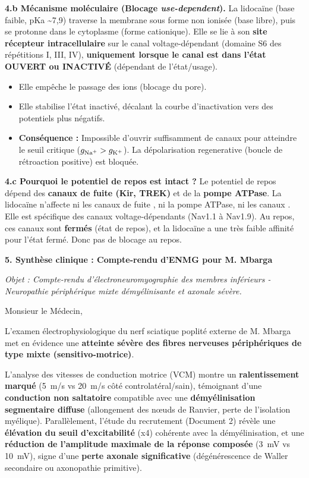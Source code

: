 \documentclass[11pt]{article}
\begin{document}
\begin{exoresolu}
\textbf{4.b Mécanisme moléculaire (Blocage \emph{use-dependent}).}
La lidocaïne (base faible, pKa \textasciitilde 7,9) traverse la membrane sous forme non ionisée (base libre), puis se protonne dans le cytoplasme (forme cationique). Elle se lie à son \textbf{site récepteur intracellulaire} sur le canal  voltage-dépendant (domaine S6 des répétitions I, III, IV), \textbf{uniquement lorsque le canal est dans l'état OUVERT ou INACTIVÉ} (dépendant de l'état/usage).
\begin{itemize}
    \item Elle empêche le passage des ions  (blocage du pore).
    \item Elle stabilise l'état inactivé, décalant la courbe d'inactivation vers des potentiels plus négatifs.
    \item \textbf{Conséquence :} Impossible d'ouvrir suffisamment de canaux  pour atteindre le seuil critique ($g_{\ce{Na+}} > g_{\ce{K+}}$). La dépolarisation regenerative (boucle de rétroaction positive) est bloquée.
\end{itemize}

\textbf{4.c Pourquoi le potentiel de repos est intact ?}
Le potentiel de repos dépend des \textbf{canaux de fuite  (Kir, TREK)} et de la \textbf{pompe  ATPase}. La lidocaïne n'affecte ni les canaux de fuite , ni la pompe ATPase, ni les canaux . Elle est spécifique des canaux  voltage-dépendants (Nav1.1 à Nav1.9). Au repos, ces canaux sont \textbf{fermés} (état de repos), et la lidocaïne a une très faible affinité pour l'état fermé. Donc pas de blocage au repos.

\textbf{5. Synthèse clinique : Compte-rendu d'ENMG pour M. Mbarga}

\textit{Objet : Compte-rendu d'électroneuromyographie des membres inférieurs - Neuropathie périphérique mixte démyélinisante et axonale sévère.}

Monsieur le Médecin,

L'examen électrophysiologique du nerf sciatique poplité externe de M. Mbarga met en évidence une \textbf{atteinte sévère des fibres nerveuses périphériques de type mixte (sensitivo-motrice)}.

L'analyse des vitesses de conduction motrice (VCM) montre un \textbf{ralentissement marqué} (\SI{5}{m/s} vs \SI{20}{m/s} côté controlatéral/sain), témoignant d'une \textbf{conduction non saltatoire} compatible avec une \textbf{démyélinisation segmentaire diffuse} (allongement des nœuds de Ranvier, perte de l'isolation myélique). Parallèlement, l'étude du recrutement (Document 2) révèle une \textbf{élévation du seuil d'excitabilité} (x4) cohérente avec la démyélinisation, et une \textbf{réduction de l'amplitude maximale de la réponse composée} (\SI{3}{mV} vs \SI{10}{mV}), signe d'une \textbf{perte axonale significative} (dégénérescence de Waller secondaire ou axonopathie primitive).


\end{exoresolu}
\end{document}

